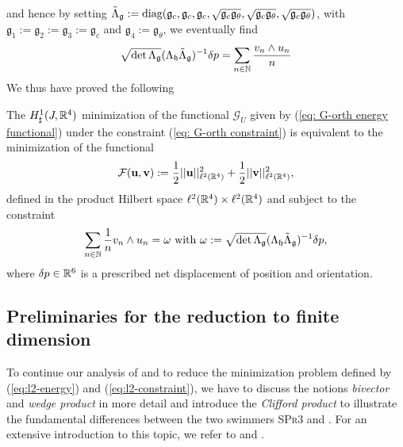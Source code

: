 and hence by setting $\tilde{\Lambda}_{\mathfrak{g}} := \operatorname{diag}(\mathfrak{g}_c, \mathfrak{g}_c, \mathfrak{g}_c, \sqrt{\mathfrak{g}_c \mathfrak{g}_{\theta}}, \sqrt{\mathfrak{g}_c \mathfrak{g}_{\theta}}, \sqrt{\mathfrak{g}_c  \mathfrak{g}_{\theta}})$, with $\mathfrak{g}_1 :=\mathfrak{g}_2 := \mathfrak{g}_3 := \mathfrak{g}_c$ and $\mathfrak{g}_4 := \mathfrak{g}_\theta$, we eventually find
\begin{equation}
\sqrt{\det \Lambda_{\mathfrak{g}}} (\Lambda_{\mathfrak{h}} \tilde{\Lambda}_{\mathfrak{g}})^{-1} \delta p = \sum_{n \in \mathbb{N}} \frac{v_n  \wedge u_n}{n}
\end{equation}
We thus have proved the following

\begin{proposition}
\label{prop: l2-minimization}
The $H_{\sharp}^1(J, \mathbb{R}^4)$ minimization of the functional $\mathcal{G}_U$ given by (\ref{eq: G-orth energy functional}) under the constraint (\ref{eq: G-orth constraint}) is equivalent to the minimization of the functional
\begin{equation}
\label{eq:l2-energy}
	\mathcal{F}(\mathbf{u}, \mathbf{v}) := \frac{1}{2} ||\mathbf{u} ||^2_{\ell^2(\mathbb{R}^4)} + \frac{1}{2} ||\mathbf{v}||^2_{\ell^2(\mathbb{R}^4)},
\end{equation}
defined in the product Hilbert space $\ell^2(\mathbb{R}^4) \times \ell^2(\mathbb{R}^4)$ and subject to the constraint
\begin{equation}
\label{eq:l2-constraint}
\sum_{n \in \mathbb{N}} \frac{1}{n} v_n \wedge u_n = \omega \text{ with } \omega := \sqrt{\det \Lambda_{\mathfrak{g}}}(\Lambda_{\mathfrak{h}} \tilde{\Lambda}_{\mathfrak{g}})^{-1} \delta p,
\end{equation}
where $\delta p \in \mathbb{R}^6$ is a prescribed net displacement of position and orientation.
\end{proposition}

\subsection{Preliminaries for the reduction to finite dimension}
To continue our analysis of \spr and to reduce the minimization problem defined by (\ref{eq:l2-energy}) and (\ref{eq:l2-constraint}), we have to discuss the notions  \emph{bivector} and \emph{wedge product} in more detail and introduce the \emph{Clifford product} to illustrate the fundamental differences between the two swimmers \textsc{SPr3} and \spr. For an extensive introduction to this topic, we refer to \cite{Lounesto2006} and \cite{Doran2007}.

